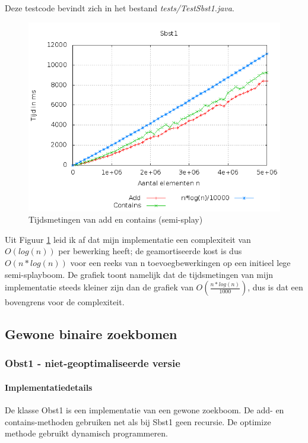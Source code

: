 \documentclass[titlepage,a4paper]{article}
\begin{document}
Deze testcode bevindt zich in het bestand \emph{tests/TestSbst1.java}.

\begin{figure}[here]
\includegraphics[width=0.9\linewidth]{../Resultaten/sbst1.png}
\caption{Tijdsmetingen van add en contains (semi-splay)}
\label{sbst1_add_contains}
\end{figure}

Uit Figuur \ref{sbst1_add_contains} leid ik af dat mijn implementatie een complexiteit van $O(log(n))$ per bewerking heeft; de geamortiseerde kost is dus $O(n*log(n))$ voor een reeks van n toevoegbewerkingen op een initieel lege semi-splayboom.
De grafiek toont namelijk dat de tijdsmetingen van mijn implementatie steeds kleiner zijn dan de grafiek van $O(\frac{n*log(n)}{1000})$, dus is dat een bovengrens voor de complexiteit.

\subsection{Gewone binaire zoekbomen}

\subsubsection{Obst1 - niet-geoptimaliseerde versie}
\paragraph{Implementatiedetails}
De klasse Obst1 is een implementatie van een gewone zoekboom. De add- en contains-methoden gebruiken net als bij Sbst1 geen recursie. De optimize methode gebruikt dynamisch programmeren.
\end{document}
